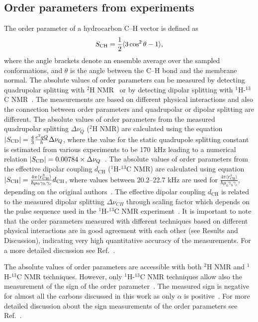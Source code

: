 \documentclass[journal=jacsat,manuscript=article]{achemso}
\begin{document}
\subsection{Order parameters from experiments}\label{expORDp}
The order parameter of a hydrocarbon C--H vector is defined as 
\begin{equation}\label{orderP}
S_{{\rm CH}}=\frac{1}{2}\langle 3 \cos^2 \theta-1 \rangle,
\end{equation} 
where the angle brackets denote an ensemble average over the sampled conformations, and $\theta$ is the angle between the C--H bond and the membrane normal.
The absolute values of order parameters can be measured by detecting quadrupolar splitting with $^2$H NMR~\cite{seelig77c} or by detecting dipolar 
splitting with $^1$H-$^{13}$C NMR~\cite{hong95a,gross97,dvinskikh05a,ferreira13}. The measurements are based on
different physical interactions and also the connection between order parameters and quadrupolar or dipolar splitting
are different. The absolute values of order parameters from the measured quadrupolar splitting $\Delta \nu_Q$ ($^2$H NMR) are calculated using 
the equation $|S_{{\rm CD}}|=\frac{4}{3} \frac{e^2qQ}{h} \Delta \nu_Q$, where the value for the static quadrupole
splitting constant is estimated from various experiments to be 170~kHz leading to a numerical relation $|S_{{\rm CD}}|=0.00784 \times \Delta \nu_Q$~\cite{seelig77c}. 
The absolute values of order parameters from the effective dipolar coupling $d_\mathrm{CH}$ ($^1$H-$^{13}$C NMR) are calculated using equation
$|S_{{\rm CH}}|=\frac{4\pi\langle r_\mathrm{CH}^3 \rangle}{\hbar \mu_0 \gamma_h \gamma_c} d_\mathrm{CH}$, where
values between 20.2--22.7 kHz are used for $\frac{4\pi\langle r_\mathrm{CH}^3 \rangle}{\hbar \mu_0 \gamma_h \gamma_c}$,
depending on the original authors~\cite{hong95a,gross97,dvinskikh05a,ferreira13}.
The effective dipolar coupling $d_\mathrm{CH}$ is related to the measured dipolar splitting $\Delta \nu_{CH}$ 
through scaling factor which depends on the pulse sequence used in the $^1$H-$^{13}$C NMR experiment~\cite{hong95a,gross97,dvinskikh05a,ferreira13}.
It is important to note that the order parameters measured with different techniques based on different physical interactions are in good agreement
with each other (see Results and Discussion), indicating very high quantitative accuracy of the measurements.
For a more detailed discussion see Ref.~. 

The absolute values of order parameters are accessible with both $^2$H NMR and $^1$H-$^{13}$C NMR techniques. 
However, only $^1$H-$^{13}$C NMR techniques allow also the measurement of the sign of the order parameter~\cite{hong95a,hong95b,gross97}. 
The measured sign is negative for almost all the carbons discussed in this work as only $\alpha$ is positive~\cite{hong95a,hong95b,gross97}. 
For more detailed discussion about the sign measurements of the order parameters see Ref.~. 
\end{document}
